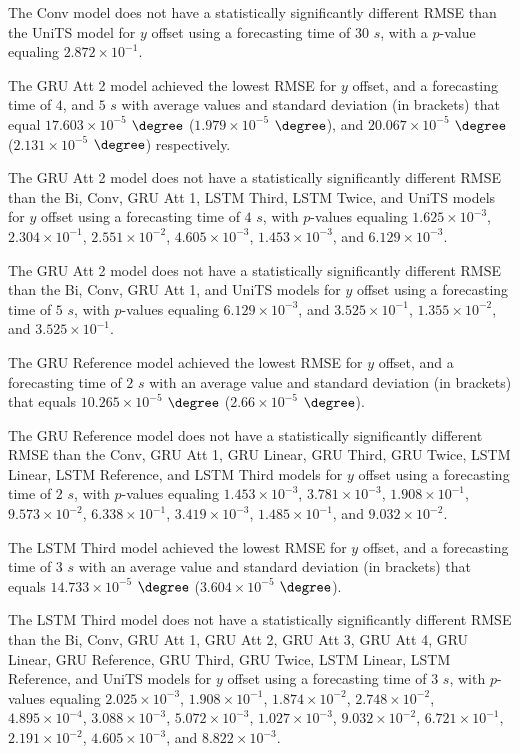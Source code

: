 The Conv model does not have a statistically significantly different RMSE than the UniTS model for $y$ offset using a forecasting time of $30$ $s$, with a $p$-value equaling $2.872 \times 10^{-1}$.

The GRU Att 2 model achieved the lowest RMSE for $y$ offset, and a forecasting time of $4$, and $5$ $s$ with average values and standard deviation (in brackets) that equal $17.603 \times 10^{-5}$ $\degree$ ($1.979 \times 10^{-5}$ $\degree$), and $20.067 \times 10^{-5}$ $\degree$ ($2.131 \times 10^{-5}$ $\degree$) respectively.

The GRU Att 2 model does not have a statistically significantly different RMSE than the Bi, Conv, GRU Att 1, LSTM Third, LSTM Twice, and UniTS models for $y$ offset using a forecasting time of $4$ $s$, with $p$-values equaling $1.625 \times 10^{-3}$, $2.304 \times 10^{-1}$, $2.551 \times 10^{-2}$, $4.605 \times 10^{-3}$, $1.453 \times 10^{-3}$, and $6.129 \times 10^{-3}$.

The GRU Att 2 model does not have a statistically significantly different RMSE than the Bi, Conv, GRU Att 1, and UniTS models for $y$ offset using a forecasting time of $5$ $s$, with $p$-values equaling $6.129 \times 10^{-3}$, and $3.525 \times 10^{-1}$, $1.355 \times 10^{-2}$, and $3.525 \times 10^{-1}$.

The GRU Reference model achieved the lowest RMSE for $y$ offset, and a forecasting time of $2$ $s$ with an average value and standard deviation (in brackets) that equals $10.265 \times 10^{-5}$ $\degree$ ($2.66 \times 10^{-5}$ $\degree$).

The GRU Reference model does not have a statistically significantly different RMSE than the Conv, GRU Att 1, GRU Linear, GRU Third, GRU Twice, LSTM Linear, LSTM Reference, and LSTM Third models for $y$ offset using a forecasting time of $2$ $s$, with $p$-values equaling $1.453 \times 10^{-3}$, $3.781 \times 10^{-3}$, $1.908 \times 10^{-1}$, $9.573 \times 10^{-2}$, $6.338 \times 10^{-1}$, $3.419 \times 10^{-3}$, $1.485 \times 10^{-1}$, and $9.032 \times 10^{-2}$.

The LSTM Third model achieved the lowest RMSE for $y$ offset, and a forecasting time of $3$ $s$ with an average value and standard deviation (in brackets) that equals $14.733 \times 10^{-5}$ $\degree$ ($3.604 \times 10^{-5}$ $\degree$).

The LSTM Third model does not have a statistically significantly different RMSE than the Bi, Conv, GRU Att 1, GRU Att 2, GRU Att 3, GRU Att 4, GRU Linear, GRU Reference, GRU Third, GRU Twice, LSTM Linear, LSTM Reference, and UniTS models for $y$ offset using a forecasting time of $3$ $s$, with $p$-values equaling $2.025 \times 10^{-3}$, $1.908 \times 10^{-1}$, $1.874 \times 10^{-2}$, $2.748 \times 10^{-2}$, $4.895 \times 10^{-4}$, $3.088 \times 10^{-3}$, $5.072 \times 10^{-3}$, $1.027 \times 10^{-3}$, $9.032 \times 10^{-2}$, $6.721 \times 10^{-1}$, $2.191 \times 10^{-2}$, $4.605 \times 10^{-3}$, and $8.822 \times 10^{-3}$.

